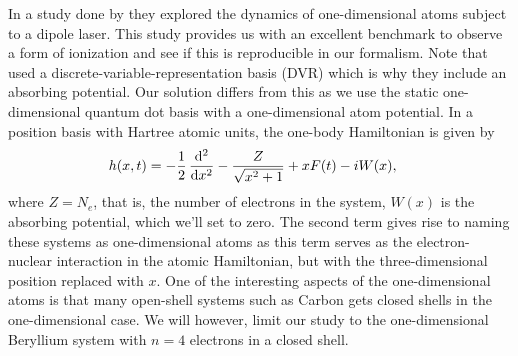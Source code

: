             In a study done by \citeauthor{miyagi_and_madsen}
            \cite{miyagi_and_madsen} they explored the dynamics of
            one-dimensional atoms subject to a dipole laser.
            This study provides us with an excellent benchmark to observe a form
            of ionization and see if this is reproducible in our formalism.
            Note that \citeauthor{miyagi_and_madsen} used a
            discrete-variable-representation basis (DVR) which is why they
            include an absorbing potential.
            Our solution differs from this as we use the static one-dimensional
            quantum dot basis with a one-dimensional atom potential.
            In a position basis with Hartree atomic units, the one-body
            Hamiltonian is given by \cite{miyagi_and_madsen}
            \begin{align}
                \oneten(x, t)
                &= -\half \dod[2]{}{x}
                - \frac{Z}{\sqrt{x^2 + 1}}
                + xF(t)
                - iW(x),
            \end{align}
            where $Z = N_e$, that is, the number of electrons in the system,
            $W(x)$ is the absorbing potential, which we'll set to zero.
            The second term gives rise to naming these systems as
            one-dimensional atoms as this term serves as the electron-nuclear
            interaction in the atomic Hamiltonian, but with the
            three-dimensional position replaced with $x$.
            One of the interesting aspects of the one-dimensional atoms is that
            many open-shell systems such as Carbon gets closed shells in the
            one-dimensional case.
            We will however, limit our study to the one-dimensional Beryllium
            system with $n = 4$ electrons in a closed shell.

